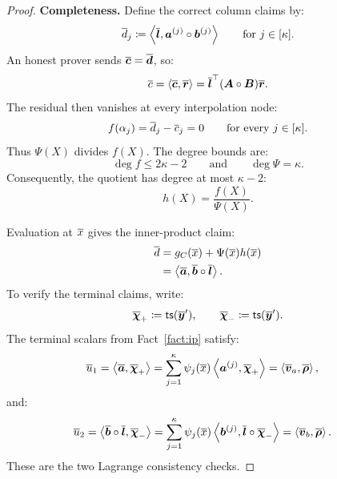 \begin{proof}
\noindent\textbf{Completeness.}
Define the correct column claims by:
\[
    \overline{d}_j
    \coloneqq
    \left\langle
        \overline{\bm l},
        \bm a^{(j)}\circ\bm b^{(j)}
    \right\rangle
    \qquad
    \text{for }j\in[\kappa].
\]
An honest prover sends \(\overline{\bm c}=\overline{\bm d}\), so:
\[
    \overline{c}
    =
    \left\langle
        \overline{\bm c},\overline{\bm r}
    \right\rangle
    =
    \overline{\bm l}^{\top}
    (\bm A\circ\bm B)
    \overline{\bm r}.
\]
The residual then vanishes at every interpolation node:
\[
    f(\alpha_j)
    =
    \overline{d}_j-\overline{c}_j
    =
    0
    \qquad
    \text{for every }j\in[\kappa].
\]
Thus \(\Psi(X)\) divides \(f(X)\). The degree bounds are:
\[
    \deg f\leq2\kappa-2
    \qquad\text{and}\qquad
    \deg\Psi=\kappa.
\]
Consequently, the quotient has degree at most \(\kappa-2\):
\[
    h(X)=\frac{f(X)}{\Psi(X)}.
\]

Evaluation at \(\overline{x}\) gives the inner-product claim:
\[
\begin{aligned}
    \overline{d}
    &=
    g_C(\overline{x})
    +
    \Psi(\overline{x})h(\overline{x})\\
    &=
    \left\langle
        \overline{\bm a},
        \overline{\bm b}\circ\overline{\bm l}
    \right\rangle.
\end{aligned}
\]
To verify the terminal claims, write:
\[
    \overline{\bm\chi}_+
    \coloneqq
    {\sf ts}(\overline{\bm y}'),
    \qquad
    \overline{\bm\chi}_-
    \coloneqq
    {\sf ts}(\overline{\bm y}').
\]
The terminal scalars from Fact~\ref{fact:ip} satisfy:
\[
\begin{aligned}
    \overline{u}_1
    &=
    \left\langle
        \overline{\bm a},\overline{\bm\chi}_+
    \right\rangle=
    \sum_{j=1}^{\kappa}
    \psi_j(\overline{x})
    \left\langle
        \bm a^{(j)},\overline{\bm\chi}_+
    \right\rangle
    =
    \left\langle
        \overline{\bm v}_a,\overline{\bm\rho}
    \right\rangle,
\end{aligned}
\]
and:
\[
\begin{aligned}
    \overline{u}_2
    &=
    \left\langle
        \overline{\bm b}\circ\overline{\bm l},
        \overline{\bm\chi}_-
    \right\rangle
    =
    \sum_{j=1}^{\kappa}
    \psi_j(\overline{x})
    \left\langle
        \bm b^{(j)},
        \overline{\bm l}\circ\overline{\bm\chi}_-
    \right\rangle
    =
    \left\langle
        \overline{\bm v}_b,\overline{\bm\rho}
    \right\rangle.
\end{aligned}
\]
These are the two Lagrange consistency checks.


\end{proof}
